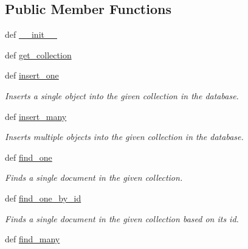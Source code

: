 \subsection*{Public Member Functions}
\begin{DoxyCompactItemize}
\item 
def \hyperlink{classNEAT__PyGenetics_1_1NEAT_1_1Repository_1_1DatabaseConnector_1_1DatabaseConnector_a57537c32ba05cb1800b4966a9b5ff97f}{\+\_\+\+\_\+init\+\_\+\+\_\+}
\item 
def \hyperlink{classNEAT__PyGenetics_1_1NEAT_1_1Repository_1_1DatabaseConnector_1_1DatabaseConnector_a0531d203c5909eb70a1f328f1ee87e46}{get\+\_\+collection}
\item 
def \hyperlink{classNEAT__PyGenetics_1_1NEAT_1_1Repository_1_1DatabaseConnector_1_1DatabaseConnector_a1c8d38690f25313e30e339bb449e2afc}{insert\+\_\+one}
\begin{DoxyCompactList}\small\item\em Inserts a single object into the given collection in the database. \end{DoxyCompactList}\item 
def \hyperlink{classNEAT__PyGenetics_1_1NEAT_1_1Repository_1_1DatabaseConnector_1_1DatabaseConnector_acaa494840a4f5c9ed45efc87a7b3c9e3}{insert\+\_\+many}
\begin{DoxyCompactList}\small\item\em Inserts multiple objects into the given collection in the database. \end{DoxyCompactList}\item 
def \hyperlink{classNEAT__PyGenetics_1_1NEAT_1_1Repository_1_1DatabaseConnector_1_1DatabaseConnector_a01ed6b2bbdf7e49c3b12260e8f716df0}{find\+\_\+one}
\begin{DoxyCompactList}\small\item\em Finds a single document in the given collection. \end{DoxyCompactList}\item 
def \hyperlink{classNEAT__PyGenetics_1_1NEAT_1_1Repository_1_1DatabaseConnector_1_1DatabaseConnector_ab84e5e82fb7f4ef7e63d1a463f931d0b}{find\+\_\+one\+\_\+by\+\_\+id}
\begin{DoxyCompactList}\small\item\em Finds a single document in the given collection based on its id. \end{DoxyCompactList}\item 
def \hyperlink{classNEAT__PyGenetics_1_1NEAT_1_1Repository_1_1DatabaseConnector_1_1DatabaseConnector_a4f488daecf67131f0a138fbe02d75ad1}{find\+\_\+many}

\end{DoxyCompactItemize}
